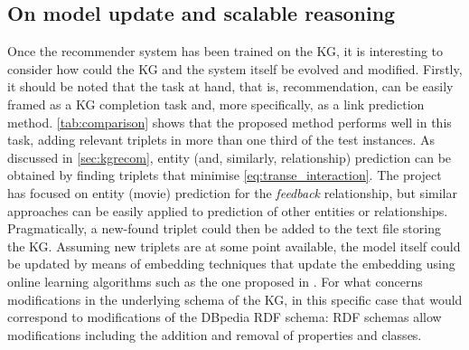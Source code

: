 \subsection{On model update and scalable reasoning}

Once the recommender system has been trained on the KG, it is interesting to consider how could the KG and the system itself be evolved and modified.
Firstly, it should be noted that the task at hand, that is, recommendation, can be easily framed as a KG completion task and, more specifically, as a link prediction method.
\cref{tab:comparison} shows that the proposed method performs well in this task, adding relevant triplets in more than one third of the test instances.
As discussed in \cref{sec:kgrecom}, entity (and, similarly, relationship) prediction can be obtained by finding triplets that minimise \cref{eq:transe_interaction}.
The project has focused on entity (movie) prediction for the \emph{feedback} relationship, but similar approaches can be easily applied to prediction of other entities or relationships.
Pragmatically, a new-found triplet could then be added to the text file storing the KG.
Assuming new triplets are at some point available, the model itself could be updated by means of embedding techniques that update the embedding using online learning algorithms such as the one proposed in \cite{wu2022efficiently}.
For what concerns modifications in the underlying schema of the KG, in this specific case that would correspond to modifications of the DBpedia RDF schema: RDF schemas allow modifications including the addition and removal of properties and classes.


